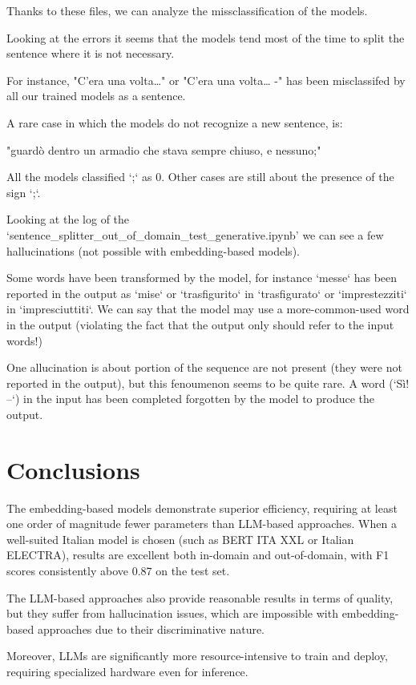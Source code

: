 \documentclass[11pt]{article}
\begin{document}
Thanks to these files, we can analyze the missclassification of the models.

Looking at the errors it seems that the models tend most of the
time to split the sentence where it is not necessary.

For instance, "C'era una volta…" or "C'era una volta… -" has been misclassifed by all our
trained models as a sentence.

A rare case in which the models do not recognize a new sentence, is:

"guardò dentro un armadio che stava sempre chiuso, e nessuno;"

All the models classified `;` as 0. Other cases are still about
the presence of the sign `;`.

Looking at the log of the `sentence\_splitter\_out\_of\_domain\_test\_generative.ipynb'
we can see a few hallucinations (not possible with embedding-based models).

Some words have been transformed by the model, for instance 
`messe` has been reported in the output as `mise` or `trasfigurito`
in `trasfigurato` or `imprestezziti` in `impresciuttiti`. We can say that the model may use
a more-common-used word in the output (violating the fact that
the output only should refer to the input words!)

One allucination is about portion of the sequence
are not present (they were not reported in the output),
but this fenoumenon seems to be quite rare.
A word (`Sì! –`) in the input has been completed forgotten
by the model to produce the output.

\section{Conclusions}

The embedding-based models demonstrate superior efficiency, requiring at least one order of magnitude fewer parameters than LLM-based approaches. When a well-suited Italian model is chosen (such as BERT ITA XXL or Italian ELECTRA), results are excellent both in-domain and out-of-domain, with F1 scores consistently above 0.87 on the test set.

The LLM-based approaches also provide reasonable results in terms of quality, but they suffer from hallucination issues, which are impossible with embedding-based approaches due to their discriminative nature.

Moreover, LLMs are significantly more resource-intensive to train and deploy, requiring specialized hardware even for inference.
\end{document}
